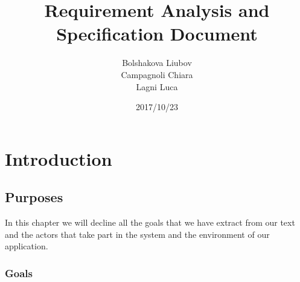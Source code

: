 \documentclass[a4paper,leqno]{book}
\begin{document}
\date{2017/10/23}
\author{Bolshakova Liubov\\ Campagnoli Chiara\\ Lagni Luca}
\title{Requirement Analysis and Specification Document}
\frontmatter                            %
\maketitle                              %
\tableofcontents                        %
\mainmatter   

\chapter{Introduction}

\section{Purposes}
In this chapter we will decline all the goals that we have extract from our text and the actors that take part in the system and the environment of our application.

\subsection{Goals}
\end{document}
